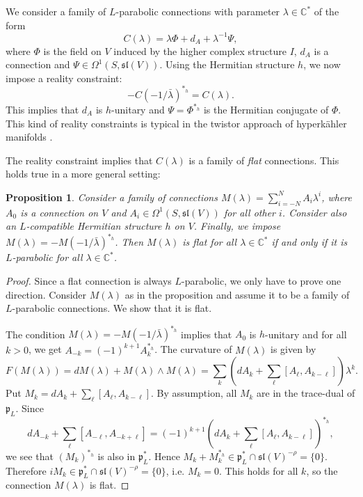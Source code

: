 \documentclass[11pt]{amsart}
\newtheorem{prop}[thm]{Proposition}
\numberwithin{thm}{section} %
\numberwithin{equation}{section} %
\numberwithin{figure}{section} %
\newcommand*{\C}{\mathbb{C}}
\renewcommand*{\l}{\lambda}
\begin{document}
We consider a family of $L$-parabolic connections with parameter $\l\in\C^*$ of the form
\begin{equation}\label{Eq:c-lambda-3}
C(\l)=\l\Phi + d_A + \l^{-1}\Psi,
\end{equation}
where $\Phi$ is the field on $V$ induced by the higher complex structure $I$, $d_A$ is a connection and $\Psi\in\Omega^1(S,\mathfrak{sl}(V))$. Using the Hermitian structure $h$, we now impose a reality constraint:
\begin{equation}\label{Eq:reality-constraint}
-C(-1/\bar{\l})^{*_h}=C(\l).
\end{equation}
This implies that $d_A$ is $h$-unitary and $\Psi=\Phi^{*_h}$ is the Hermitian conjugate of $\Phi$. This kind of reality constraints is typical in the twistor approach of hyperkähler manifolds \cite[Section 3 (F)]{HKLR}.

The reality constraint implies that $C(\l)$ is a family of \emph{flat} connections. This holds true in a more general setting:

\begin{prop}\label{Prop:flat-para-equiv}
    Consider a family of connections $M(\l)=\sum_{i=-N}^N A_i\l^i$, where $A_0$ is a connection on $V$ and $A_i\in\Omega^1(S,\mathfrak{sl}(V))$ for all other $i$. Consider also an $L$-compatible Hermitian structure $h$ on $V$. Finally, we impose $M(\l)=-M(-1/\bar{\l})^{*_h}$. Then $M(\l)$ is flat for all $\l\in\C^*$ if and only if it is $L$-parabolic for all $\l\in\C^*$.
\end{prop}

\begin{proof}
    Since a flat connection is always $L$-parabolic, we only have to prove one direction. Consider $M(\l)$ as in the proposition and assume it to be a family of $L$-parabolic connections. We show that it is flat.
    
    The condition $M(\l)=-M(-1/\bar{\l})^{*_h}$ implies that $A_0$ is $h$-unitary and for all $k>0$, we get $A_{-k}=(-1)^{k+1}A_k^{*_h}$. The curvature of $M(\l)$ is given by
    \begin{equation}\label{Eq:curv-general}
    F(M(\l)) = dM(\l)+M(\l)\wedge M(\l) = \textstyle\sum_k \left(dA_k+\textstyle\sum_\ell [A_\ell,A_{k-\ell}]\right)\l^k.
    \end{equation}
    Put $M_k=dA_k+\sum_\ell [A_\ell,A_{k-\ell}]$. By assumption, all $M_k$ are in the trace-dual of $\mathfrak{p}_L$. Since
    $$dA_{-k}+\textstyle\sum_\ell [A_{-\ell},A_{-k+\ell}] = (-1)^{k+1}\left(dA_k+\textstyle\sum_\ell [A_\ell,A_{k-\ell}]\right)^{*_h},$$
    we see that $(M_k)^{*_h}$ is also in $\mathfrak{p}_L^*$. Hence $M_k+M_k^{*_h}\in\mathfrak{p}_L^*\cap \mathfrak{sl}(V)^{-\rho}=\{0\}$. Therefore $iM_k\in \mathfrak{p}_L^*\cap \mathfrak{sl}(V)^{-\rho}=\{0\}$, i.e. $M_k=0$. This holds for all $k$, so the connection $M(\l)$ is flat.
\end{proof}
\end{document}
